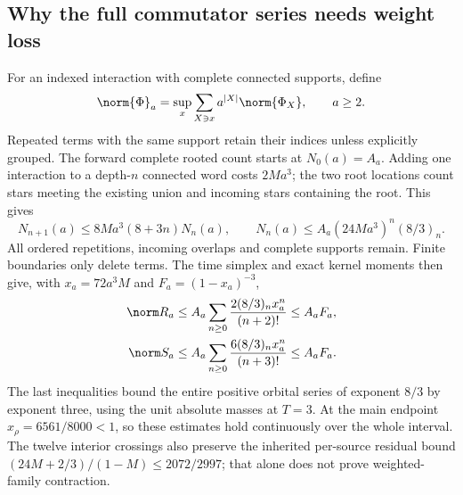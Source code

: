 \subsection{Why the full commutator series needs weight loss}
For an indexed interaction with complete connected supports, define
\begin{equation}
\norm{\Phi}_a=\sup_x\sum_{X\ni x}a^{|X|}\norm{\Phi_X},\qquad a\ge2.
\label{r27:eq:norm}
\end{equation}
Repeated terms with the same support retain their indices unless explicitly grouped. The forward complete rooted count starts at $N_0(a)=A_a$. Adding one interaction to a depth-$n$ connected word costs $2Ma^3$; the two root locations count stars meeting the existing union and incoming stars containing the root. This gives
\begin{equation}
N_{n+1}(a)\le8Ma^3(8+3n)N_n(a),\qquad
N_n(a)\le A_a(24Ma^3)^n(8/3)_n.
\label{r27:eq:agcount}
\end{equation}
All ordered repetitions, incoming overlaps and complete supports remain. Finite boundaries only delete terms. The time simplex and exact kernel moments then give, with $x_a=72a^3M$ and $F_a=(1-x_a)^{-3}$,
\begin{align}
\norm R_a&\le A_a\sum_{n\ge0}\frac{2(8/3)_nx_a^n}{(n+2)!}\le A_aF_a,\nonumber\\
\norm S_a&\le A_a\sum_{n\ge0}\frac{6(8/3)_nx_a^n}{(n+3)!}\le A_aF_a.
\label{r27:eq:agfilterbudget}
\end{align}
The last inequalities bound the entire positive orbital series of exponent $8/3$ by exponent three, using the unit absolute masses at $T=3$. At the main endpoint $x_\rho=6561/8000<1$, so these estimates hold continuously over the whole interval. The twelve interior crossings also preserve the inherited per-source residual bound $(24M+2/3)/(1-M)\le2072/2997$; that alone does not prove weighted-family contraction.

